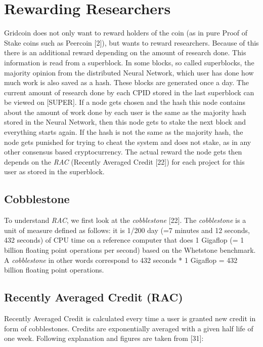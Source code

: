 \section{Rewarding Researchers}

Gridcoin does not only want to reward holders of the coin (as in pure Proof of Stake coins such as Peercoin [2]), but wants to reward researchers. Because of this there is an additional reward depending on the amount of research done. This information is read from a superblock. In some blocks, so called superblocks, the majority opinion from the distributed Neural Network, which user has done how much work is also saved as a hash. These blocks are generated once a day. The current amount of research done by each CPID stored in the last superblock can be viewed on [SUPER]. If a node gets chosen and the hash this node contains about the amount of work done by each user is the same as the majority hash stored in the Neural Network, then this node gets to stake the next block and everything starts again. If the hash is not the same as the majority hash, the node gets punished for trying to cheat the system and does not stake, as in any other consensus based cryptocurrency. The actual reward the node gets then depends on the \textit{RAC} (Recently Averaged Credit [22]) for each project for this user as stored in the superblock.\\

\subsection{Cobblestone}

To understand \textit{RAC}, we first look at the \textit{cobblestone} [22]. The \textit{cobblestone} is a unit of measure defined as follows: it is 1/200 day (=7 minutes and 12 seconds, 432 seconds) of CPU time on a reference computer that does 1 Gigaflop (= 1 billion floating point operations per second) based on the Whetstone benchmark. A \textit{cobblestone} in other words correspond to 432 seconds * 1 Gigaflop = 432 billion floating point operations.\\


\subsection{Recently Averaged Credit (RAC)}

Recently Averaged Credit is calculated every time a user is granted new credit in form of cobblestones. Credits are exponentially averaged with a given half life of one week. Following explanation and figures are taken from [31]:\\

